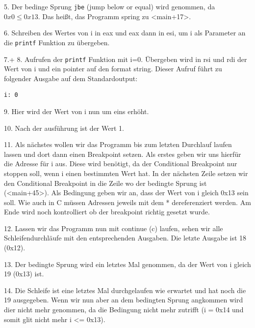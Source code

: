 \documentclass[12pt]{article}
\begin{document}

5. Der bedinge Sprung \texttt{jbe} (jump below or equal) wird genommen, da $ 0x0 \le 0x13$. Das heißt, das Programm spring zu <main+17>.


6. Schreiben des Wertes von i in eax und eax dann in esi, um i als Parameter an die \texttt{printf} Funktion zu übergeben.


7.+ 8. Aufrufen der \texttt{printf} Funktion mit i=0. Übergeben wird in rsi und rdi der Wert von i und ein pointer auf den format string. Dieser Aufruf führt zu folgender Ausgabe auf dem Standardoutput:

\begin{lstlisting}
i: 0
\end{lstlisting}


9. Hier wird der Wert von i nun um eins erhöht.


10. Nach der ausführung ist der Wert 1.


11. Als nächstes wollen wir das Programm bis zum letzten Durchlauf laufen lassen und dort dann einen Breakpoint setzen. Als erstes geben wir uns hierfür die Adresse für i aus. Diese wird benötigt, da der Conditional Breakpoint nur stoppen soll, wenn i einen bestimmten Wert hat. In der nächsten Zeile setzen wir den Conditional Breakpoint in die Zeile wo der bedingte Sprung ist (<main+45>). Als Bedingung geben wir an, dass der Wert von i gleich 0x13 sein soll. Wie auch in C müssen Adressen jeweils mit dem * dereferenziert werden. Am Ende wird noch kontrolliert ob der breakpoint richtig gesetzt wurde.


12. Lassen wir das Programm nun mit continue (c) laufen, sehen wir alle Schleifendurchläufe mit den entsprechenden Ausgaben. Die letzte Ausgabe ist 18 (0x12).


13. Der bedingte Sprung wird ein letztes Mal genommen, da der Wert von i gleich 19 (0x13) ist.


14. Die Schleife ist eine letztes Mal durchgelaufen wie erwartet und hat noch die 19 ausgegeben. Wenn wir nun aber an dem bedingten Sprung angkommen wird dier nicht mehr genommen, da die Bedingung nicht mehr zutrifft (i = 0x14 und somit glit nicht mehr i <= 0x13).
\end{document}

